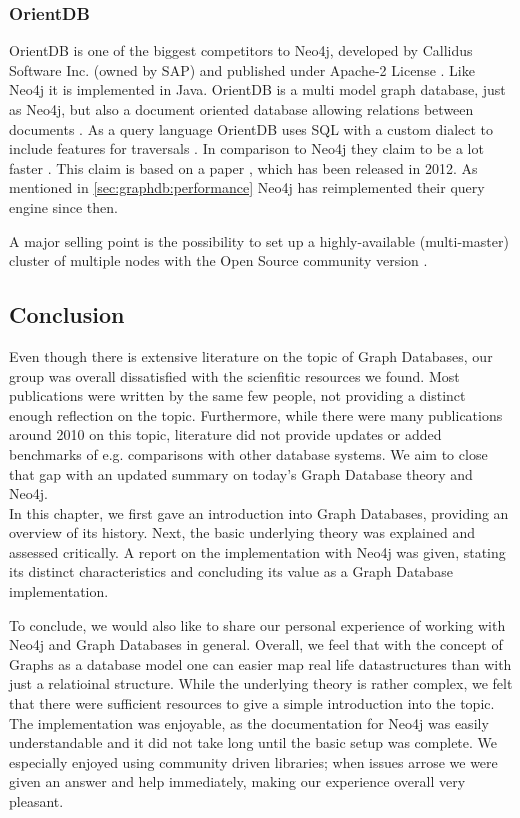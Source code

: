 \subsubsection{OrientDB}
OrientDB is one of the biggest competitors to Neo4j, developed by Callidus Software Inc. (owned by SAP) and published under Apache-2 License \autocite{orientdb:vs_neo4j}.
Like Neo4j it is implemented in Java.
OrientDB is a multi model graph database, just as Neo4j, but also a document oriented database allowing relations between documents \autocite{orientdb:why}.
As a query language OrientDB uses SQL with a custom dialect to include features for traversals \autocite{orientdb:vs_neo4j}.
In comparison to Neo4j they claim to be a lot faster \autocite{orientdb:vs_neo4j}.
This claim is based on a paper \autocite{cloudcom:2012}, which has been released in 2012.
As mentioned in \autoref{sec:graphdb:performance} Neo4j has reimplemented their query engine since then.


A major selling point is the possibility to set up a highly-available (multi-master) cluster of multiple nodes with the Open Source community version \autocite{orientdb:cluster, orientdb:support}.

\subsection{Conclusion}
Even though there is extensive literature on the topic of Graph Databases, our group was overall dissatisfied with the scienfitic resources we found. Most publications were written by the same few people, not providing a distinct enough reflection on the topic. Furthermore, while there were many publications around 2010 on this topic, literature did not provide updates or added benchmarks of e.g. comparisons with other database systems. We aim to close that gap with an updated summary on today's Graph Database theory and Neo4j. \\
In this chapter, we first gave an introduction into Graph Databases, providing an overview of its history. Next, the basic underlying theory was explained and assessed critically. A report on the implementation with Neo4j was given, stating its distinct characteristics and concluding its value as a Graph Database implementation.

To conclude, we would also like to share our personal experience of working with Neo4j and Graph Databases in general. Overall, we feel that with the concept of Graphs as a database model one can easier map real life datastructures than with just a relatioinal structure. While the underlying theory is rather complex, we felt that there were sufficient resources to give a simple introduction into the topic. The implementation was enjoyable, as the documentation for Neo4j was easily understandable and it did not take long until the basic setup was complete. We especially enjoyed using community driven libraries; when issues arrose we were given an answer and help immediately, making our experience overall very pleasant.  

